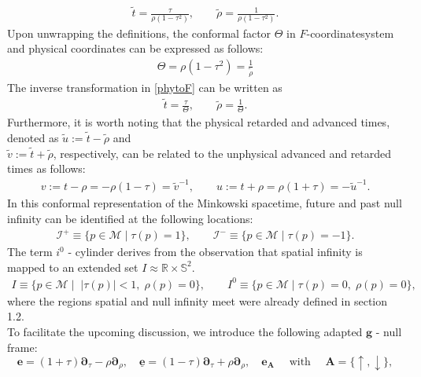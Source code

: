 \begin{align}\label{phytoF}
\tilde{t} = \frac{\tau}{\rho (1-\tau^2)}, \qquad \tilde{\rho}=\frac{1}{\rho (1-\tau^2)}.
\end{align}
Upon unwrapping the definitions, the conformal factor $\Theta$ in $F$-coordinatesystem and physical coordinates can be expressed as follows:
\begin{align}
\Theta = \rho (1-\tau^2) = \frac{1}{\tilde{\rho}}
\end{align}
The inverse transformation in \eqref{phytoF} can be written as
\begin{align}
\tilde{t}=\frac{\tau}{\Theta}, \qquad \tilde{\rho}= \frac{1}{\Theta}.
\end{align}
Furthermore, it is worth noting that the physical retarded and advanced times, denoted as $\tilde{u}:=\tilde{t}- \tilde{\rho}$ and 
\\$ \tilde{v}:= \tilde{t}+ \tilde{\rho}$, respectively, can be related to the unphysical advanced and retarded times as follows:
\begin{align}\label{eq:UnphysPhysAdvRet}
v:=t-\rho=-\rho(1-\tau)=\tilde{v}^{-1}, \qquad u:=t+\rho=\rho(1+\tau)=-\tilde{u}^{-1}.
\end{align}
In this conformal representation of the Minkowski spacetime, future and past null infinity can be identified at the following locations:
\begin{align}
\mathscr{I}^{+} \equiv \{ p \in \mathcal{M} \; \rvert\; \tau(p) =1\}, \qquad \mathscr{I}^{-} \equiv \{ p \in \mathcal{M} \; \rvert \;\tau(p) =-1\}.
\end{align}
The term $i^0$ - cylinder derives from the observation that spatial infinity is mapped to an extended set $I \approx \mathbb{R}\times \mathbb{S}^2$.
\begin{align*}
I \equiv \{ p \in \mathcal{M} \; \rvert \;\; |\tau(p)|<1, \;\rho(p)=0\}, \qquad I^{0} \equiv \{ p \in \mathcal{M}\; \rvert \;\tau(p)=0, \; \rho(p)=0\},
\end{align*}
where the regions spatial and null infinity meet were already defined in section 1.2.\\
To facilitate the upcoming discussion, we introduce the following adapted $\boldsymbol{g}$ - null frame:
\begin{equation}\label{eq:Fframe}
\boldsymbol{e}=(1+\tau) \boldsymbol{\partial}_\tau-\rho \boldsymbol{\partial}_\rho, \quad \underline{\boldsymbol{e}}=(1-\tau) \boldsymbol{\partial}_\tau+\rho \boldsymbol{\partial}_\rho, \quad \boldsymbol{e}_{\boldsymbol{A}} \quad \text { with } \quad \boldsymbol{A}=\{\uparrow, \downarrow\},
\end{equation}
